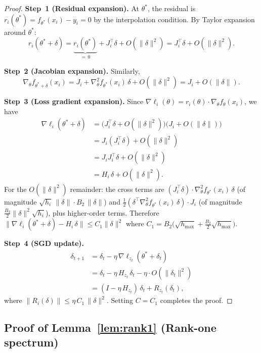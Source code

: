 \documentclass[11pt,a4paper]{article}
\theoremstyle{definition}
\theoremstyle{remark}
\begin{document}
\begin{proof}
\textbf{Step~1 (Residual expansion).}\;
At $\theta^*$, the residual is $r_i(\theta^*) = f_{\theta^*}(x_i) - y_i = 0$
by the interpolation condition.  By Taylor expansion around $\theta^*$:
\[
  r_i(\theta^* + \delta)
  = \underbrace{r_i(\theta^*)}_{=\,0} + J_i^\top \delta + O(\|\delta\|^2)
  = J_i^\top \delta + O(\|\delta\|^2).
\]

\textbf{Step~2 (Jacobian expansion).}\;
Similarly,
\[
  \nabla_\theta f_{\theta^* + \delta}(x_i)
  = J_i + \nabla^2_\theta f_{\theta^*}(x_i)\,\delta + O(\|\delta\|^2)
  = J_i + O(\|\delta\|).
\]

\textbf{Step~3 (Loss gradient expansion).}\;
Since $\nabla\ell_i(\theta) = r_i(\theta) \cdot \nabla_\theta f_\theta(x_i)$,
we have
\begin{align*}
  \nabla\ell_i(\theta^* + \delta)
  &= \bigl(J_i^\top \delta + O(\|\delta\|^2)\bigr)
     \bigl(J_i + O(\|\delta\|)\bigr) \\
  &= J_i(J_i^\top \delta) + O(\|\delta\|^2) \\
  &= J_i J_i^\top \delta + O(\|\delta\|^2) \\
  &= H_i\,\delta + O(\|\delta\|^2).
\end{align*}
For the $O(\|\delta\|^2)$ remainder: the cross terms are
$(J_i^\top \delta) \cdot \nabla^2_\theta f_{\theta^*}(x_i)\,\delta$
(of magnitude $\sqrt{h_i}\,\|\delta\| \cdot B_2\,\|\delta\|$)
and
$\frac{1}{2}(\delta^\top \nabla^2_\theta f_{\theta^*}(x_i)\,\delta) \cdot J_i$
(of magnitude $\frac{B_2}{2}\|\delta\|^2\sqrt{h_i}$),
plus higher-order terms.  Therefore
$\|\nabla\ell_i(\theta^* + \delta) - H_i\,\delta\| \leq C_1\|\delta\|^2$
where $C_1 = B_2\bigl(\sqrt{h_{\max}} + \frac{B_2}{2}\sqrt{h_{\max}}\bigr)$.

\textbf{Step~4 (SGD update).}\;
\begin{align*}
  \delta_{t+1}
  &= \delta_t - \eta\,\nabla\ell_{z_t}(\theta^* + \delta_t) \\
  &= \delta_t - \eta\,H_{z_t}\,\delta_t - \eta \cdot O(\|\delta_t\|^2) \\
  &= (I - \eta\,H_{z_t})\,\delta_t + R_{z_t}(\delta_t),
\end{align*}
where $\|R_i(\delta)\| \leq \eta\, C_1\,\|\delta\|^2$.  Setting $C = C_1$
completes the proof.
\end{proof}

\subsection{Proof of Lemma~\ref{lem:rank1} (Rank-one spectrum)}
\end{document}
